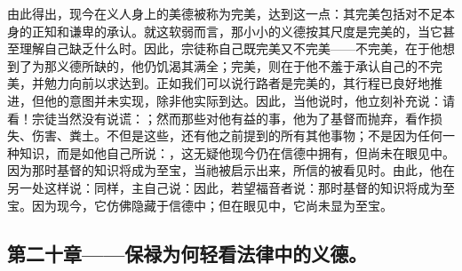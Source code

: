 由此得出，现今在义人身上的美德被称为完美，达到这一点：其完美包括对不足本身的正知和谦卑的承认。就这软弱而言，那小小的义德按其尺度是完美的，当它甚至理解自己缺乏什么时。因此，宗徒称自己既完美又不完美——不完美，在于他想到了为那义德所缺的，他仍饥渴其满全；完美，则在于他不羞于承认自己的不完美，并勉力向前以求达到。正如我们可以说行路者是完美的，其行程已良好地推进，但他的意图并未实现，除非他实际到达。因此，当他说时，他立刻补充说：请看！宗徒当然没有说谎：；然而那些对他有益的事，他为了基督而抛弃，看作损失、伤害、粪土。不但是这些，还有他之前提到的所有其他事物；不是因为任何一种知识，而是如他自己所说：，这无疑他现今仍在信德中拥有，但尚未在眼见中。因为那时基督的知识将成为至宝，当祂被启示出来，所信的被看见时。由此，他在另一处这样说：同样，主自己说：因此，若望福音者说：那时基督的知识将成为至宝。因为现今，它仿佛隐藏于信德中；但在眼见中，它尚未显为至宝。\par


\subsection{第二十章——保禄为何轻看法律中的义德。}


